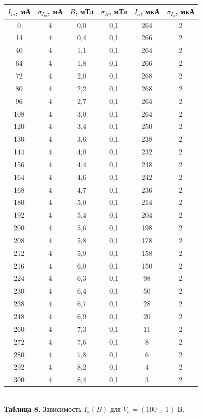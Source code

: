\documentclass{article}
\begin{document}
\begin{center}
\begin{tabular}{|c|c|c|c|c|c|}
\hline
$I_m$, мА & $\sigma_{I_m}$, мА & $B$, мТл & $\sigma_B$, мТл & $I_a$, мкА & $\sigma_{I_a}$, мкА \\ \hline
0 & 4 & 0,0 & 0,1 & 264 & 2 \\ \hline
14 & 4 & 0,4 & 0,1 & 266 & 2 \\ \hline
40 & 4 & 1,1 & 0,1 & 264 & 2 \\ \hline
64 & 4 & 1,8 & 0,1 & 266 & 2 \\ \hline
72 & 4 & 2,0 & 0,1 & 268 & 2 \\ \hline
80 & 4 & 2,2 & 0,1 & 268 & 2 \\ \hline
96 & 4 & 2,7 & 0,1 & 264 & 2\\ \hline
108 & 4 & 3,0 & 0,1 & 264 & 2 \\ \hline
120 & 4 & 3,4 & 0,1 & 250 & 2 \\ \hline
130 & 4 & 3,6 & 0,1 & 238 & 2 \\ \hline
144 & 4 & 4,0 & 0,1 & 232 & 2 \\ \hline
156 & 4 & 4,4 & 0,1 & 248 & 2 \\ \hline
164 & 4 & 4,6 & 0,1 & 242 & 2 \\ \hline
168 & 4 & 4,7 & 0,1 & 236 & 2 \\ \hline
180 & 4 & 5,0 & 0,1 & 214 & 2 \\ \hline
192 & 4 & 5,4 & 0,1 & 204 & 2 \\ \hline
200 & 4 & 5,6 & 0,1 & 198 & 2 \\ \hline
208 & 4 & 5,8 & 0,1 & 178 & 2 \\ \hline
212 & 4 & 5,9 & 0,1 & 158 & 2 \\ \hline
216 & 4 & 6,0 & 0,1 & 150 & 2 \\ \hline
224 & 4 & 6,3 & 0,1 & 98 & 2 \\ \hline
230 & 4 & 6,4 & 0,1 & 50 & 2 \\ \hline
238 & 4 & 6,7 & 0,1 & 28 & 2 \\ \hline
248 & 4 & 6,9 & 0,1 & 20 & 2 \\ \hline
260 & 4 & 7,3 & 0,1 & 11 & 2 \\ \hline
272 & 4 & 7,6 & 0,1 & 8 & 2 \\ \hline
280 & 4 & 7,8 & 0,1 & 6 & 2 \\ \hline
292 & 4 & 8,2 & 0,1 & 4 & 2 \\ \hline
300 & 4 & 8,4 & 0,1 & 3 & 2 \\ \hline
\end{tabular}\\
\textbf{Таблица 8.} Зависимость $I_a(B)$ для $V_a = (100 \pm 1)$ В.
\end{center}
\end{document}
